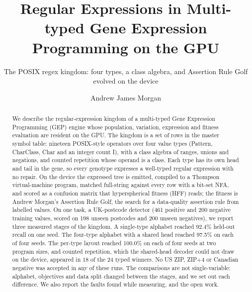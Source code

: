 \documentclass[sigconf,nonacm]{acmart}
\newcommand{\ty}[1]{\textsf{#1}}
\begin{document}
\title{Regular Expressions in Multi-typed Gene Expression Programming on the GPU}
\subtitle{The POSIX regex kingdom: four types, a class algebra, and
Assertion Rule Golf evolved on the device}

\author{Andrew James Morgan}
\renewcommand{\shortauthors}{Morgan}

\begin{abstract}
We describe the regular-expression kingdom of a multi-typed Gene Expression
Programming (GEP) engine whose population, variation, expression and fitness
evaluation are resident on the GPU. The kingdom is a set of rows in the master
symbol table: nineteen POSIX-style operators over four value types
(\ty{Pattern}, \ty{CharClass}, \ty{Char} and an integer count \ty{I}), with a
class algebra of ranges, unions and negations, and counted repetition whose
operand is a class. Each type has its own head and tail in the gene, so every
genotype expresses a well-typed regular expression with no repair. On the device
the expressed tree is emitted, compiled to a Thompson virtual-machine program,
matched full-string against every row with a bit-set NFA, and scored as a
confusion matrix that hyperspherical fitness (HFF) reads; the fitness is Andrew
Morgan's Assertion Rule Golf, the search for a data-quality assertion rule from
labelled values. On one task, a UK-postcode detector (461 positive and 200
negative training values, scored on 198 unseen postcodes and 200 unseen
negatives), we report three measured stages of the kingdom. A single-type
alphabet reached 92.4\% held-out recall on one seed. The four-type alphabet with
a shared head reached 97.5\% on each of four seeds. The per-type layout
reached 100.0\% on each of four seeds at two program sizes, and counted
repetition, which the shared-head decoder could not draw on the device, appeared
in 18 of the 24 typed winners. No US ZIP, ZIP+4 or Canadian negative was accepted
in any of these runs. The comparisons are not single-variable: alphabet,
objectives and data split changed between the stages, and we set out each
difference. We also report the faults found while measuring, and the open work.
\end{abstract}

\maketitle

\end{document}
